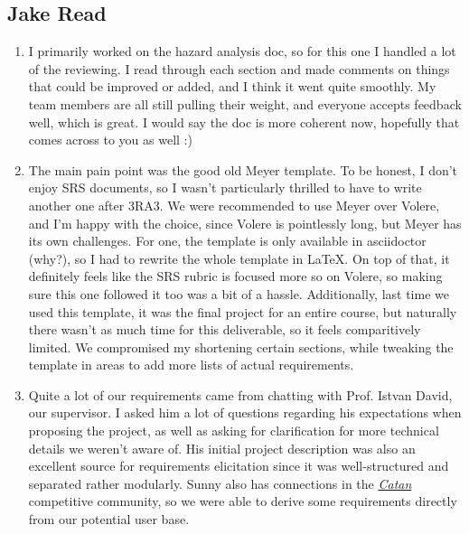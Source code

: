 \documentclass{article}
\newcommand{\Catan}{\href{https://en.wikipedia.org/wiki/Catan}{Catan}}
\begin{document}
\subsection*{Jake Read}\label{subsec:jake-read}
\begin{enumerate}
    \item I primarily worked on the hazard analysis doc, so for this one I handled a lot of the reviewing.
    I read through each section and made comments on things that could be improved or added, and I think it went quite smoothly.
    My team members are all still pulling their weight, and everyone accepts feedback well, which is great.
    I would say the doc is more coherent now, hopefully that comes across to you as well :)

    \item The main pain point was the good old Meyer template.
    To be honest, I don't enjoy SRS documents, so I wasn't particularly thrilled to have to write another one after 3RA3.
    We were recommended to use Meyer over Volere, and I'm happy with the choice, since Volere is pointlessly long, but Meyer has its own challenges.
    For one, the template is only available in asciidoctor (why?), so I had to rewrite the whole template in LaTeX\@.
    On top of that, it definitely feels like the SRS rubric is focused more so on Volere, so making sure this one followed it too was a bit of a hassle.
    Additionally, last time we used this template, it was the final project for an entire course, but naturally there wasn't as much time for this deliverable, so it feels comparitively limited.
    We compromised my shortening certain sections, while tweaking the template in areas to add more lists of actual requirements.

    \item Quite a lot of our requirements came from chatting with Prof. Istvan David, our supervisor.
    I asked him a lot of questions regarding his expectations when proposing the project, as well as asking for clarification for more technical details we weren't aware of.
    His initial project description was also an excellent source for requirements elicitation since it was well-structured and separated rather modularly.
    Sunny also has connections in the \emph{\Catan{}} competitive community, so we were able to derive some requirements directly from our potential user base.


\end{enumerate}
\end{document}
